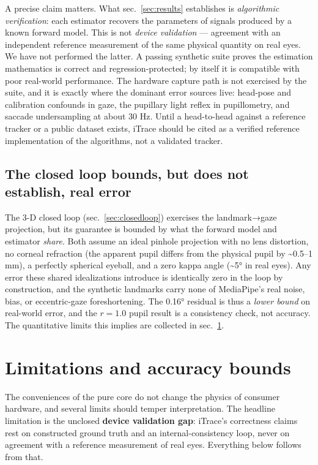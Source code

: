 \documentclass[
]{article}
\begin{document}
A precise claim matters. What sec.~\ref{sec:results} establishes is
\emph{algorithmic verification}: each estimator recovers the parameters
of signals produced by a known forward model. This is not \emph{device
validation} --- agreement with an independent reference measurement of
the same physical quantity on real eyes. We have not performed the
latter. A passing synthetic suite proves the estimation mathematics is
correct and regression-protected; by itself it is compatible with poor
real-world performance. The hardware capture path is not exercised by
the suite, and it is exactly where the dominant error sources live:
head-pose and calibration confounds in gaze, the pupillary light reflex
in pupillometry, and saccade undersampling at about 30 Hz. Until a
head-to-head against a reference tracker or a public dataset exists,
iTrace should be cited as a verified reference implementation of the
algorithms, not a validated tracker.

\subsection{The closed loop bounds, but does not establish, real
error}\label{the-closed-loop-bounds-but-does-not-establish-real-error}

The 3-D closed loop (sec.~\ref{sec:closedloop}) exercises the
landmark→gaze projection, but its guarantee is bounded by what the
forward model and estimator \emph{share}. Both assume an ideal pinhole
projection with no lens distortion, no corneal refraction (the apparent
pupil differs from the physical pupil by \textasciitilde0.5--1 mm), a
perfectly spherical eyeball, and a zero kappa angle (\textasciitilde5°
in real eyes). Any error these shared idealizations introduce is
identically zero in the loop by construction, and the synthetic
landmarks carry none of MediaPipe's real noise, bias, or eccentric-gaze
foreshortening. The 0.16° residual is thus a \emph{lower bound} on
real-world error, and the \(r = 1.0\) pupil result is a consistency
check, not accuracy. The quantitative limits this implies are collected
in sec.~\ref{sec:limitations}.

\section{Limitations and accuracy bounds}\label{sec:limitations}

The conveniences of the pure core do not change the physics of consumer
hardware, and several limits should temper interpretation. The headline
limitation is the unclosed \textbf{device validation gap}: iTrace's
correctness claims rest on constructed ground truth and an
internal-consistency loop, never on agreement with a reference
measurement of real eyes. Everything below follows from that.
\end{document}
